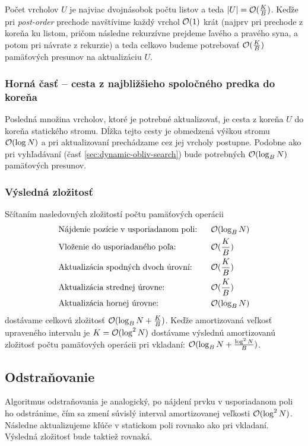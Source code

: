 Počet vrcholov $U$ je najviac dvojnásobok počtu listov a teda $|U| = \mathcal{O}(\frac{K}{B})$. Keďže pri \emph{post-order} prechode navštívime každý vrchol $\mathcal{O}(1)$ krát (najprv pri prechode z koreňa ku listom, pričom následne rekurzívne prejdeme ľavého a pravého syna, a potom pri návrate z rekurzie) a teda celkovo budeme potrebovať $\mathcal{O}(\frac{K}{B})$ pamäťových presunov na aktualizáciu $U$.

\subsubsection{Horná časť -- cesta z najbližšieho spoločného predka do koreňa}
Posledná množina vrcholov, ktoré je potrebné aktualizovať,     je cesta z koreňa $U$ do koreňa statického stromu. Dĺžka tejto cesty je obmedzená výškou stromu $\mathcal{O}(\log{N})$ a pri aktualizovaní prechádzame cez jej vrcholy postupne. Podobne ako pri vyhľadávaní (časť \ref{sec:dynamic-obliv-search}) bude potrebných $\mathcal{O}(\log_B{N})$ pamäťových presunov.

\subsubsection{Výsledná zložitosť}
Sčítaním nasledovných zložitostí počtu pamäťových operácii
\[
\begin{aligned}
&\text{Nájdenie pozície v usporiadanom poli:} ~~ &&\mathcal{O}(\log_B{N}) \\
&\text{Vloženie do usporiadaného poľa:} &&\mathcal{O}(\frac{K}{B}) \\
&\text{Aktualizácia spodných dvoch úrovní:} &&\mathcal{O}(\frac{K}{B}) \\
&\text{Aktualizácia strednej úrovne:} &&\mathcal{O}(\frac{K}{B}) \\
&\text{Aktualizácia hornej úrovne:} &&\mathcal{O}(\log_B{N}) \\
\end{aligned}
\]
dostávame celkovú zložitosť $\mathcal{O}(\log_B{N} + \frac{K}{B})$. Keďže amortizovaná veľkosť upraveného intervalu je $K = \mathcal{O}(\log^2{N})$ dostávame výslednú amortizovanú zložitosť počtu pamäťových operácii pri vkladaní: $\mathcal{O}(\log_B{N} + \frac{\log^2{N}}{B})$.

\subsection{Odstraňovanie}
Algoritmus odstraňovania je analogický, po nájdení prvku v usporiadanom poli ho odstránime, čím sa zmení súvislý interval amortizovanej veľkosti $\mathcal{O}(\log^2{N})$. Následne aktualizujeme kľúče v statickom poli rovnako ako pri vkladaní. Výsledná zložitosť bude taktiež rovnaká.

